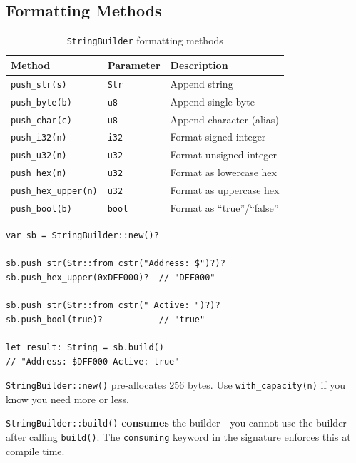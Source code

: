 \subsection{Formatting Methods}

\begin{table}[h]
\centering
\begin{tabular}{lll}
\textbf{Method} & \textbf{Parameter} & \textbf{Description} \\
\hline
\texttt{push\_str(s)} & \texttt{Str} & Append string \\
\texttt{push\_byte(b)} & \texttt{u8} & Append single byte \\
\texttt{push\_char(c)} & \texttt{u8} & Append character (alias) \\
\texttt{push\_i32(n)} & \texttt{i32} & Format signed integer \\
\texttt{push\_u32(n)} & \texttt{u32} & Format unsigned integer \\
\texttt{push\_hex(n)} & \texttt{u32} & Format as lowercase hex \\
\texttt{push\_hex\_upper(n)} & \texttt{u32} & Format as uppercase hex \\
\texttt{push\_bool(b)} & \texttt{bool} & Format as ``true''/``false'' \\
\end{tabular}
\caption{\texttt{StringBuilder} formatting methods}
\end{table}

\begin{lstlisting}
var sb = StringBuilder::new()?

sb.push_str(Str::from_cstr("Address: $")?)?
sb.push_hex_upper(0xDFF000)?  // "DFF000"

sb.push_str(Str::from_cstr(" Active: ")?)?
sb.push_bool(true)?           // "true"

let result: String = sb.build()
// "Address: $DFF000 Active: true"
\end{lstlisting}

\begin{notebox}
\texttt{StringBuilder::new()} pre-allocates 256 bytes. Use \texttt{with\_capacity(n)} if you know you need more or less.
\end{notebox}

\begin{warningbox}
\texttt{StringBuilder::build()} \textbf{consumes} the builder---you cannot use the builder after calling \texttt{build()}. The \texttt{consuming} keyword in the signature enforces this at compile time.
\end{warningbox}

